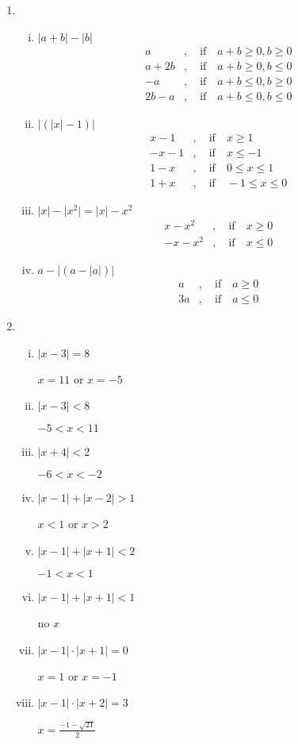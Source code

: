 \documentclass{amsart}
\begin{document}
\begin{enumerate}[1.]
  \item
    \begin{enumerate}[(i)]
  \item $\lvert a+b \rvert - \lvert b \rvert$
    \begin{align*}
      a&, \quad \text{if}\quad a+b\geq 0, b\geq0 \\
      a+2b&, \quad \text{if}\quad a+b \geq 0, b \leq 0\\
      -a&, \quad \text{if}\quad a+b\leq0, b\geq0\\
      2b-a&, \quad \text{if}\quad a+b \leq 0, b\leq0
    \end{align*}
  \item $\lvert ( \lvert x \rvert-1)\rvert $
    \begin{align*}
      x-1&, \quad \text{if}\quad x\geq 1\\
      -x-1&, \quad \text{if}\quad x\leq -1\\
      1-x&, \quad \text{if}\quad 0\leq x \leq1\\
      1+x&, \quad \text{if}\quad -1 \leq x \leq0
    \end{align*}
    
  \item $\lvert x \rvert-\lvert x^{2} \rvert=\lvert x \rvert -x^{2}$
    \begin{align*}
      x-x{^2}&, \quad \text{if}\quad x\geq0\\
      -x-x^{2}&, \quad \text{if}\quad x \leq0
    \end{align*}
  \item $a-\lvert (a - \lvert a \rvert)\rvert$
    \begin{align*}
      a&, \quad \text{if}\quad a\geq0\\
      3a&, \quad \text{if}\quad a\leq0
    \end{align*}
  \end{enumerate}
\item
  \begin{enumerate}[(i)]
  \item $\lvert x-3 \rvert=8$
    
    $x=11$ or $x=-5$
  \item $\lvert x-3 \rvert <8$
    
    $-5<x<11$
  \item $\lvert x+4 \rvert <2$
    
    $-6<x<-2$
  \item $\lvert x-1 \rvert + \lvert x-2 \rvert>1$
    
    $x<1$ or $x>2$
  \item $\lvert x-1 \rvert + \lvert x+1 \rvert<2$
    
    $-1<x<1$
  \item $\lvert x-1 \rvert + \lvert x+1 \rvert <1$
    
    no $x$
  \item $\lvert x-1 \rvert \cdot \lvert x+1 \rvert = 0$
    
    $x=1$ or $x=-1$
  \item $\lvert x-1 \rvert \cdot \lvert x+2 \rvert=3$
    
    $x=\frac{-1-\sqrt{21}}{2}$
    \end{enumerate}
  \end{enumerate}
\end{document}
